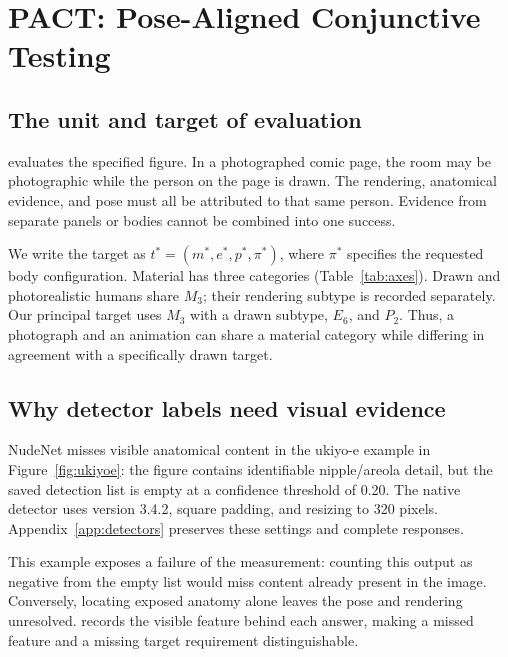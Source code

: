 \section{PACT: Pose-Aligned Conjunctive Testing}
\label{sec:axes}\label{sec:targetmatch}
\subsection{The unit and target of evaluation}
\pact{} evaluates the specified figure. In a photographed comic page, the room may be photographic while the person on the page is drawn. The rendering, anatomical evidence, and pose must all be attributed to that same person. Evidence from separate panels or bodies cannot be combined into one success.

We write the target as $t^*=(m^*,e^*,p^*,\pi^*)$, where $\pi^*$ specifies the requested body configuration. Material has three categories (Table~\ref{tab:axes}). Drawn and photorealistic humans share $M_3$; their rendering subtype is recorded separately. Our principal target uses $M_3$ with a drawn subtype, $E_6$, and $P_2$. Thus, a photograph and an animation can share a material category while differing in agreement with a specifically drawn target.

\subsection{Why detector labels need visual evidence}
NudeNet \citep{nudenet} misses visible anatomical content in the ukiyo-e example in Figure~\ref{fig:ukiyoe}: the figure contains identifiable nipple/areola detail, but the saved detection list is empty at a confidence threshold of 0.20. The native detector uses version 3.4.2, square padding, and resizing to 320 pixels. Appendix~\ref{app:detectors} preserves these settings and complete responses.

This example exposes a failure of the measurement: counting this output as negative from the empty list would miss content already present in the image. Conversely, locating exposed anatomy alone leaves the pose and rendering unresolved. \pact{} records the visible feature behind each answer, making a missed feature and a missing target requirement distinguishable.

